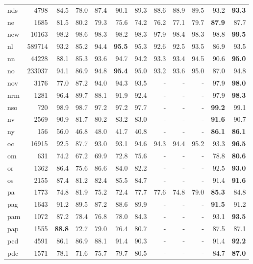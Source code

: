 \documentclass[11pt,a4paper]{article}
\begin{document}
\begin{supertabular}{lrrr|rrr|rrr|rr}
nds & 4798 & 84.5 & 78.0 & 87.4 & 90.1 & 89.3 & 88.6 & 88.9 & 89.5 & 93.2 & \textbf{93.3}\\
ne & 1685 & 81.5 & 80.2 & 79.3 & 75.6 & 74.2 & 76.2 & 77.1 & 79.7 & \textbf{87.9} & 87.7\\
new & 10163 & 98.2 & 98.6 & 98.3 & 98.2 & 98.3 & 97.9 & 98.4 & 98.3 & 98.8 & \textbf{99.5}\\
nl & 589714 & 93.2 & 85.2 & 94.4 & \textbf{95.5} & 95.3 & 92.6 & 92.5 & 93.5 & 86.9 & 93.5\\
nn & 44228 & 88.1 & 85.3 & 93.6 & 94.7 & 94.2 & 93.3 & 93.4 & 94.5 & 90.6 & \textbf{95.0}\\
no & 233037 & 94.1 & 86.9 & 94.8 & \textbf{95.4} & 95.0 & 93.2 & 93.6 & 95.0 & 87.0 & 94.8\\
nov & 3176 & 77.0 & 87.2 & 94.0 & 94.3 & 93.5 & - & - & - & 97.9 & \textbf{98.0}\\
nrm & 1281 & 96.4 & 89.7 & 88.1 & 91.9 & 92.4 & - & - & - & 97.9 & \textbf{98.3}\\
nso & 720 & 98.9 & 98.7 & 97.2 & 97.2 & 97.7 & - & - & - & \textbf{99.2} & 99.1\\
nv & 2569 & 90.9 & 81.7 & 80.2 & 83.2 & 83.0 & - & - & - & \textbf{91.6} & 90.7\\
ny & 156 & 56.0 & 46.8 & 48.0 & 41.7 & 40.8 & - & - & - & \textbf{86.1} & \textbf{86.1}\\
oc & 16915 & 92.5 & 87.7 & 93.0 & 93.1 & 94.6 & 94.3 & 94.4 & 95.2 & 93.3 & \textbf{96.5}\\
om & 631 & 74.2 & 67.2 & 69.9 & 72.8 & 75.6 & - & - & - & 78.8 & \textbf{80.6}\\
or & 1362 & 86.4 & 75.6 & 86.6 & 84.0 & 82.2 & - & - & - & 92.5 & \textbf{93.0}\\
os & 2155 & 87.4 & 81.2 & 82.4 & 85.5 & 84.7 & - & - & - & 91.4 & \textbf{91.6}\\
pa & 1773 & 74.8 & 81.9 & 75.2 & 72.4 & 77.7 & 77.6 & 74.8 & 79.0 & \textbf{85.3} & 84.8\\
pag & 1643 & 91.2 & 89.5 & 87.2 & 88.6 & 89.9 & - & - & - & \textbf{91.5} & 91.2\\
pam & 1072 & 87.2 & 78.4 & 76.8 & 78.0 & 84.3 & - & - & - & 93.1 & \textbf{93.5}\\
pap & 1555 & \textbf{88.8} & 72.7 & 79.0 & 76.4 & 80.7 & - & - & - & 87.5 & 87.1\\
pcd & 4591 & 86.1 & 86.9 & 88.1 & 91.4 & 90.3 & - & - & - & 91.4 & \textbf{92.2}\\
pdc & 1571 & 78.1 & 71.6 & 75.7 & 79.7 & 80.5 & - & - & - & 84.7 & \textbf{87.0}\\

\end{supertabular}
\end{document}
